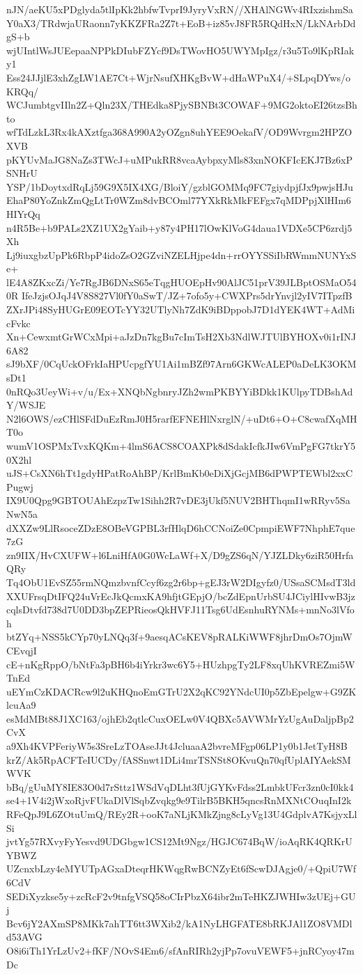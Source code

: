 nJN/aeKU5xPDglyda5tlIpKk2hbfwTvprI9JyryVxRN//XHAlNGWv4RIxzishmSa
Y0aX3/TRdwjaURaonn7yKKZFRa2Z7t+EoB+iz85vJ8FR5RQdHxN/LkNArbDdgS+b
wjUIntlWsJUEepaaNPPkDIubFZYcf9DsTWovHO5UWYMpIgz/r3u5To9lKpRIaky1
Ess24JJjlE3xhZgLW1AE7Ct+WjrNsufXHKgBvW+dHaWPuX4/+SLpqDYws/oKRQq/
WCJumbtgvIIln2Z+Qln23X/THEdka8PjySBNBt3COWAF+9MG2oktoEI26tzsBhto
wfTdLzkL3Rx4kAXztfga368A990A2yOZgn8uhYEE9OekafV/OD9Wvrgm2HPZOXVB
pKYUvMaJG8NaZs3TWcJ+uMPukRR8vcaAybpxyMls83xnNOKFIcEKJ7Bz6xPSNHrU
YSP/1bDoytxdRqLj59G9X5IX4XG/BloiY/gzblGOMMq9FC7giydpjfJx9pwjsHJu
EhaP80YoZnkZmQgLtTr0WZm8dvBCOml77YXkRkMkFEFgx7qMDPpjXlHIm6HIYrQq
n4R5Be+b9PALs2XZ1UX2gYaib+y87y4PH17lOwKlVoG4daua1VDXe5CP6zrdj5Xh
Lj9iuxgbzUpPk6RbpP4idoZsO2GZviNZELHjpe4dn+rrOYYSSiIbRWmmNUNYxSe+
lE4A8ZKxcZi/Ye7RgJB6DNxS65eTqgHUOEpHv90AlJC51prV39JLBptOSMaO540R
IfeJzjsOJqJ4V8S827Vl0fY0aSwT/JZ+7ofo5y+CWXPrs5drYnvjl2yIV7ITpzfB
ZXrJPi48SyHUGrE09EOTcYY32UTlyNh7ZdK9iBDppobJ7D1dYEK4WT+AdMicFvkc
Xn+CewxmtGrWCxMpi+aJzDn7kgBu7cImTsH2Xb3NdlWJTUlBYHOXv0i1rINJ6A82
sJ9bXF/0CqUckOFrkIaHPUcpgfYU1Ai1mBZf97Arn6GKWcALEP0aDeLK3OKMsDt1
0nRQo3UeyWi+v/u/Ex+XNQbNgbnryJZh2wmPKBYYiBDkk1KUlpyTDBshAdY/WSJE
N2l6OWS/ezCHlSFdDuEzRmJ0H5rarfEFNEHlNxrglN/+uDt6+O+C8cwafXqMHT0o
wumV1OSPMxTvxKQKm+4lmS6ACS8COAXPk8dSdakIcfkJIw6VmPgFG7tkrY50X2hl
uJS+CsXN6hTt1gdyHPatRoAhBP/KrlBmKb0eDiXjGcjMB6dPWPTEWbl2xxCPugwj
IX9U0Qpg9GBTOUAhEzpzTw1Sihh2R7vDE3jUkf5NUV2BHThqmI1wRRyv5SaNwN5a
dXXZw9LlRsoceZDzE8OBeVGPBL3rfHlqD6hCCNoiZe0CpmpiEWF7NhphE7que7zG
zn9IIX/HvCXUFW+l6LniHfA0G0WcLaWf+X/D9gZS6qN/YJZLDky6ziR50HrfaQRy
Tq4ObU1EvSZ55rmNQmzbvnfCcyf6zg2r6bp+gEJ3rW2DIgyfz0/USsaSCMsdT3ld
XXUFrsqDtIFQ24uVrEcJkQcmxKA9hfjtGEpjO/bcZdEpnUrbSU4JCiylHIvwB3jz
cqlsDtvfd738d7U0DD3bpZEPRieosQkHVFJ11Tsg6UdEsnhuRYNMs+mnNo3lVfoh
btZYq+NSS5kCYp70yLNQq3f+9aesqACsKEV8pRALKiWWF8jhrDmOs7OjmWCEvqjI
cE+nKgRppO/bNtFa3pBH6b4iYrkr3wc6Y5+HUzhpgTy2LF8xqUhKVREZmi5WTnEd
uEYmCzKDACRcw9l2uKHQnoEmGTrU2X2qKC92YNdcUI0p5ZbEpelgw+G9ZKlcuAa9
esMdMBt88J1XC163/ojhEb2qtlcCuxOELw0V4QBXc5AVWMrYzUgAuDaljpBp2CvX
a9Xh4KVPFeriyW5s3SreLzTOAseJJt4JcluaaA2bvreMFgp06LP1y0b1JetTyH8B
krZ/Ak5RpACFTeIUCDy/fASSnwt1DLi4mrTSNSt8OKvuQn70qfUplAIYAekSMWVK
bBq/gUuMY8IE83O0d7rSttz1WSdVqDLht3fUjGYKvFdss2LmbkUFcr3zn0cI0kk4
se4+1V4i2jWxoRjvFUkaDlVlSqbZvqkg9e9TilrB5BKH5qncsRnMXNtCOuqInI2k
RFeQpJ9L6ZOtuUmQ/REy2R+ooK7aNLjKMkZjng8cLyVg13U4GdplvA7KsjyxLlSi
jvtYg57RXvyFyYesvd9UDGbgw1CS12Mt9Ngz/HGJC674BqW/ioAqRK4QRKrUYBWZ
UZcnxbLzy4eMYUTpAGxaDteqrHKWqgRwBCNZyEt6fScwDJAgje0/+QpiU7Wf6CdV
SEDiXyzkse5y+zcRcF2v9tnfgVSQ58oCIrPbzX64ibr2mTeHKZJWHIw3zUEj+GUj
Bcv6jY2AXmSP8MKk7ahTT6tt3WXib2/kA1NyLHGFATE8bRKJAl1ZO8VMDld53AVG
O8i6iTh1YrLzUv2+fKF/NOvS4Em6/sfAnRIRh2yjPp7ovuVEWF5+jnRCyoy47mDc
